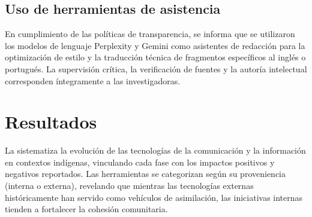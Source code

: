 \documentclass[spanish]{textolivre}
\begin{document}
\subsection{Uso de herramientas de asistencia}
En cumplimiento de las políticas de transparencia, se informa que se utilizaron los modelos de lenguaje Perplexity y Gemini como asistentes de redacción para la optimización de estilo y la traducción técnica de fragmentos específicos al inglés o portugués. La supervisión crítica, la verificación de fuentes y la autoría intelectual corresponden íntegramente a las investigadoras.

\section{Resultados}

La  sistematiza la evolución de las tecnologías de la comunicación y la información en contextos indígenas, vinculando cada fase con los impactos positivos y negativos reportados. Las herramientas se categorizan según su proveniencia (interna o externa), revelando que mientras las tecnologías externas históricamente han servido como vehículos de asimilación, las iniciativas internas tienden a fortalecer la cohesión comunitaria.
\end{document}
